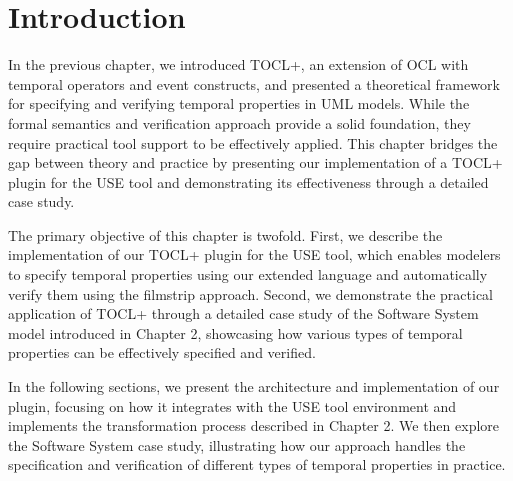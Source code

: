 \section{Introduction}

\hspace{1cm} In the previous chapter, we introduced TOCL+, an extension of OCL with temporal operators and event constructs, and presented a theoretical framework for specifying and verifying temporal properties in UML models. While the formal semantics and verification approach provide a solid foundation, they require practical tool support to be effectively applied. This chapter bridges the gap between theory and practice by presenting our implementation of a TOCL+ plugin for the USE tool and demonstrating its effectiveness through a detailed case study.

The primary objective of this chapter is twofold. First, we describe the implementation of our TOCL+ plugin for the USE tool, which enables modelers to specify temporal properties using our extended language and automatically verify them using the filmstrip approach. Second, we demonstrate the practical application of TOCL+ through a detailed case study of the Software System model introduced in Chapter 2, showcasing how various types of temporal properties can be effectively specified and verified.

In the following sections, we present the architecture and implementation of our plugin, focusing on how it integrates with the USE tool environment and implements the transformation process described in Chapter 2. We then explore the Software System case study, illustrating how our approach handles the specification and verification of different types of temporal properties in practice.